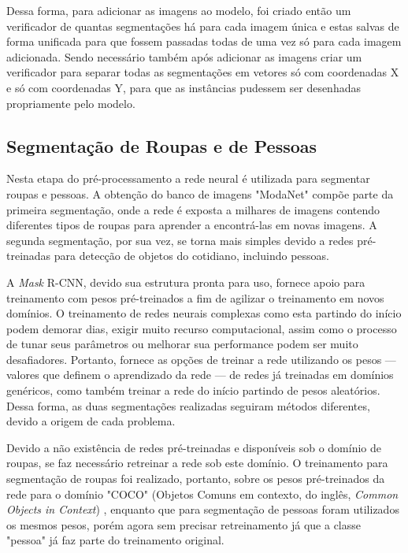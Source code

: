 \documentclass[12pt]{report}
\begin{document}
Dessa forma, para adicionar as imagens ao modelo, foi criado então um verificador de quantas segmentações há para cada imagem única e estas salvas de forma unificada para que fossem passadas todas de uma vez só para cada imagem adicionada. Sendo necessário também após adicionar as imagens criar um verificador para separar todas as segmentações em vetores só com coordenadas X e só com coordenadas Y, para que as instâncias pudessem ser desenhadas propriamente pelo modelo. 

\subsection{Segmentação de Roupas e de Pessoas}

Nesta etapa do pré-processamento a rede neural é utilizada para segmentar roupas e pessoas. A obtenção do banco de imagens "ModaNet" compõe parte da primeira segmentação, onde a rede é exposta a milhares de imagens contendo diferentes tipos de roupas para aprender a encontrá-las em novas imagens. A segunda segmentação, por sua vez, se torna mais simples devido a redes pré-treinadas para detecção de objetos do cotidiano, incluindo pessoas. 

A \textit{Mask} R-CNN, devido sua estrutura pronta para uso, fornece apoio para treinamento com pesos pré-treinados a fim de agilizar o treinamento em novos domínios. O treinamento de redes neurais complexas como esta partindo do início podem demorar dias, exigir muito recurso computacional, assim como o processo de tunar seus parâmetros ou melhorar sua performance podem ser muito desafiadores. Portanto, \cite{maskrcnnimplem} fornece as opções de treinar a rede utilizando os pesos --- valores que definem o aprendizado da rede --- de redes já treinadas em domínios genéricos, como também treinar a rede do início partindo de pesos aleatórios. Dessa forma, as duas segmentações realizadas seguiram métodos diferentes, devido a origem de cada problema. 

Devido a não existência de redes pré-treinadas e disponíveis sob o domínio de roupas, se faz necessário retreinar a rede sob este domínio. O treinamento para segmentação de roupas foi realizado, portanto, sobre os pesos pré-treinados da rede para o domínio "COCO" (Objetos Comuns em contexto, do inglês, \textit{Common Objects in Context}) \cite{COCO}, enquanto que para segmentação de pessoas foram utilizados os mesmos pesos, porém agora sem precisar retreinamento já que a classe "pessoa" já faz parte do treinamento original.
\end{document}
